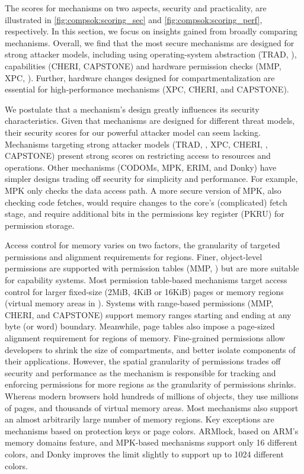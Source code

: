 The scores for mechanisms on two aspects, security and practicality, 
are illustrated in 
\autoref{fig:compsok:scoring_sec} and \autoref{fig:compsok:scoring_perf},
respectively.
In this section, we focus on insights gained from broadly
comparing mechanisms.
Overall, we find that the most secure mechanisms are designed for strong
attacker models, including using
operating-system abstraction (TRAD, \lwc), capabilities (CHERI, CAPSTONE)
and hardware permission checks (MMP, XPC, \seccells).
Further, hardware changes designed for compartmentalization are essential for
high-performance mechanisms (XPC, CHERI, \seccells and CAPSTONE).

We postulate that a mechanism's design greatly influences its security
characteristics.
Given that mechanisms are designed for different threat models, their
security scores for our powerful attacker model can seem lacking.
Mechanisms targeting strong attacker 
models (TRAD, \lwc, XPC, CHERI, \seccells, CAPSTONE) 
present strong scores on restricting access to resources and operations.
Other mechanisms (CODOMs, MPK, ERIM, and Donky) have simpler designs
trading off security for simplicity and performance.
For example, MPK only checks the data access path. 
A more secure version of MPK, also checking code fetches, would require
changes to the core's (complicated) fetch stage, and require additional
bits in the permissions key register (PKRU) for permission storage.

Access control for memory varies on two factors, the granularity of targeted
permissions and alignment requirements for regions.
Finer, object-level permissions are supported with 
permission tables (MMP, \seccells) but are more suitable for capability systems.
Most permission table-based mechanisms target access control for larger
fixed-size (2MiB, 4KiB or 16KiB) pages or 
memory regions (virtual memory areas in \seccells).
Systems with range-based permissions (MMP, CHERI, \seccells and CAPSTONE) support
memory ranges starting and ending at any byte (or word) boundary.
Meanwhile, page tables also impose a page-sized alignment requirement for
regions of memory.
Fine-grained permissions allow developers to shrink the size of compartments, 
and better isolate components of their applications.
However, the spatial granularity of permissions trades off security and
performance as the mechanism is responsible for tracking and enforcing
permissions for more regions as the granularity of permissions shrinks.
Whereas modern browsers hold hundreds of millions of objects, they use
millions of pages, and thousands of virtual memory areas.
Most mechanisms also support an almost arbitrarily large number of memory
regions.
Key exceptions are mechanisms based on protection keys or page colors.
ARMlock, based on ARM's memory domains feature,
and MPK-based mechanisms support only 16 different colors, and 
Donky improves the limit slightly to support up to
1024 different colors.

